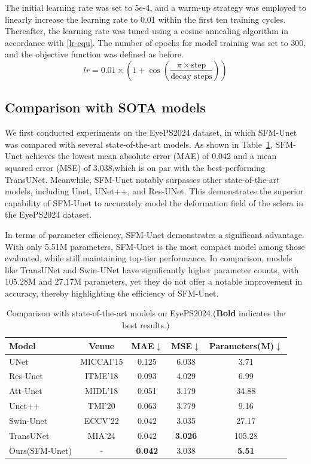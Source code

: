 \documentclass[AMA,Times1COL]{WileyNJDv5} %
\begin{document}
The initial learning rate was set to 5e-4, and a warm-up strategy was employed to linearly increase the learning rate to 0.01 within the first ten training cycles. Thereafter, the learning rate was tuned using a cosine annealing algorithm in accordance with \eqref{lr-equ}. The number of epochs for model training was set to 300, and the objective function was defined as before.
\begin{equation}
    \label{lr-equ}
    lr = 0.01 \times \left(1 + \cos\left(\frac{\pi \times \text{step}}{\text{decay steps}}\right)\right)
\end{equation}

\subsection{Comparison with SOTA models}
We first conducted experiments on the EyePS2024 dataset, in which SFM-Unet was compared with several state-of-the-art models. As shown in Table~\ref{tab:mae_mse_comparison}, SFM-Unet achieves the lowest mean absolute error (MAE) of 0.042 and a mean squared error (MSE) of 3.038,which is on par with the best-performing TransUNet. Meanwhile, SFM-Unet notably surpasses other state-of-the-art models, including Unet, UNet++, and Res-UNet. This demonstrates the superior capability of SFM-Unet to accurately model the deformation field of the sclera in the EyePS2024 dataset.

In terms of parameter efficiency, SFM-Unet demonstrates a significant advantage. With only 5.51M parameters, SFM-Unet is the most compact model among those evaluated, while still maintaining top-tier performance. In comparison, models like TransUNet and Swin-UNet have significantly higher parameter counts, with 105.28M and 27.17M parameters, yet they do not offer a notable improvement in accuracy, thereby highlighting the efficiency of SFM-Unet.

\begin{table}[htbp]
\scriptsize
\centering
\caption{Comparison with state-of-the-art models on EyePS2024.(\textbf{Bold} indicates the best results.)}
\begin{tabular}{lcccc}
\toprule
\textbf{Model} & \textbf{Venue} & \textbf{MAE$\downarrow$} & \textbf{MSE$\downarrow$}  & \textbf{Parameters(M)$\downarrow$}\\
\midrule
UNet\cite{ronneberger2015u}  & MICCAI'15   & 0.125  & 6.038 & 3.71 \\
Res-Unet\cite{xiao2018weighted} & ITME'18 & 0.093  & 4.029 & 6.99 \\
Att-Unet\cite{oktay2018attention} & MIDL'18 & 0.051  & 3.179 & 34.88 \\
Unet++\cite{zhou2019unet++} & TMI'20 & 0.063  & 3.779 & 9.16 \\
Swin-Unet\cite{cao2022swin} & ECCV'22 & 0.042  & 3.035 & 27.17 \\
TransUNet\cite{chen2024transunet} & MIA'24 & 0.042  & \textbf{3.026} & 105.28 \\
Ours(SFM-Unet) & - & \textbf{0.042}  & 3.038 & \textbf{5.51} \\
\bottomrule
\end{tabular}
\label{tab:mae_mse_comparison}
\end{table}
\end{document}
